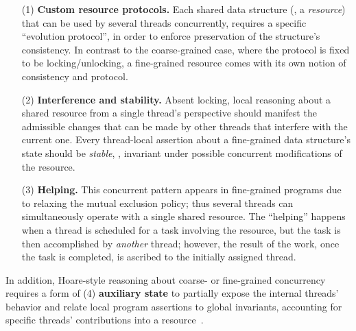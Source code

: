 \begin{itemize}[itemindent=0pt] 

\item[(1)] \textbf{Custom resource protocols.} Each shared data
  structure (\ie, a \emph{resource}) that can be used by several
  threads concurrently, requires a specific ``evolution protocol'', in
  order to enforce preservation of the structure's consistency.
% 
  In contrast to the coarse-grained case, where the protocol is fixed to
  be locking/unlocking, a fine-grained resource comes with its own
  notion of consistency and protocol.
  
\item[(2)] \textbf{Interference and stability.} Absent locking, local reasoning
  about a shared resource from a single thread's perspective should manifest
  the admissible changes that
  can be made by other threads that interfere with the current one. Every thread-local assertion about a fine-grained data structure's state 
  should be \emph{stable}, \ie, invariant under possible concurrent
  modifications of the resource.
%

\item[(3)] \textbf{Helping.} This concurrent pattern appears in
  fine-grained programs due to relaxing the {mutual exclusion} policy;
  thus several threads can simultaneously operate with a single shared
  resource. The ``helping'' happens when a thread is scheduled for a
  task involving the resource, but the task is then accomplished by
  \emph{another} thread; however, the result of the work, once the
  task is completed, is ascribed to the initially assigned thread.
%
%

\end{itemize}
%
\noindent
%
In addition, Hoare-style reasoning about coarse- or fine-grained
concurrency requires a form of (4) \textbf{auxiliary state} to
partially expose the internal threads' behavior and relate local
program assertions to global invariants, accounting for specific
threads' contributions into a resource~\cite{Jones:TR09}.
%

